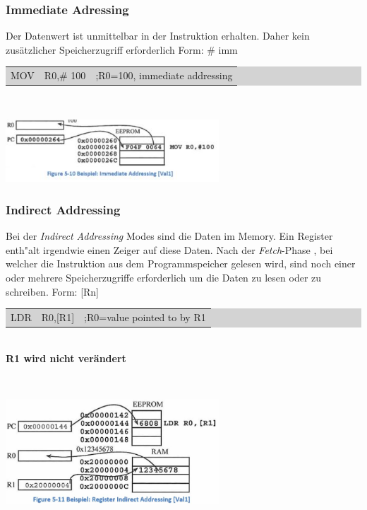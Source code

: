  \subsubsection{Immediate Adressing}
\begin{minipage}{10cm}
        Der Datenwert ist unmittelbar in der Instruktion erhalten. Daher kein zusätzlicher Speicherzugriff erforderlich\newline
        Form: \# imm\newline
        \colorbox{lightgray}{
        \begin{tabular}{lll}
             MOV & R0,\# 100&;R0=100, immediate addressing \\ 
        \end{tabular} }
\end{minipage}
%
\begin{minipage}{0.5cm}
	\-\
\end{minipage}
%
\begin{minipage}{8cm}
	 \includegraphics[width=8cm]{images/immediateAddressing}    
\end{minipage}  

\subsubsection{Indirect Addressing}
\begin{minipage}{10cm}
        Bei der \textit{Indirect Addressing} Modes sind die Daten im Memory. Ein Register enth"alt irgendwie einen Zeiger auf diese Daten. Nach der \textit{Fetch}-Phase , bei welcher die Instruktion aus dem Programmspeicher gelesen wird,
        sind noch einer oder mehrere Speicherzugriffe erforderlich um die Daten zu lesen oder zu schreiben.\newline
        Form: [Rn]\newline
        \colorbox{lightgray}{
        \begin{tabular}{lll}
            LDR & R0,[R1]&;R0=value pointed to by R1 \\ 
        \end{tabular} }\\
        \textbf{R1 wird nicht verändert}
\end{minipage}
%
\begin{minipage}{0.5cm}
	\-\
\end{minipage}
%
\begin{minipage}{8cm}
	\includegraphics[width=8cm]{images/indirectAddressing}    
\end{minipage}

